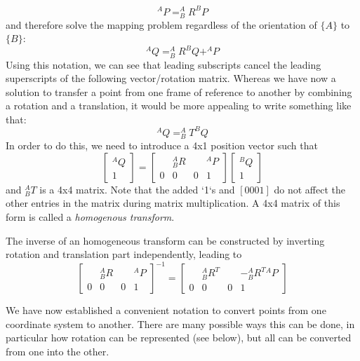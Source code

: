 \begin{equation}
^AP=^A_BR^BP
\end{equation}
%
and therefore solve the mapping problem regardless of the orientation of $\{A\}$ to $\{B\}$:
\begin{equation}
^AQ=^A_BR^BQ+^AP
\end{equation}
Using this notation, we can see that leading subscripts cancel the leading superscripts of the following vector/rotation matrix. Whereas we have now a solution to transfer a point from one frame of reference to another by combining a rotation and a translation, it would be more appealing to write something like that:
\begin{equation}
^AQ=^A_BT^BQ
\end{equation}
In order to do this, we need to introduce a 4x1 position vector such that
\begin{equation}
\left[\begin{array}{c}^AQ\\1\end{array}\right]=\left[\begin{array}{ccc|c} & ^A_BR & & ^AP \\\hline 0 & 0 & 0 & 1\end{array}\right]\left[\begin{array}{c}^BQ\\1\end{array}\right]
\end{equation}
and $^A_BT$ is a 4x4 matrix.  Note that the added `1`s and $ [0 0 0 1]$ do not affect the other entries in the matrix during matrix multiplication. A 4x4 matrix of this form is called a \emph{homogenous transform}.

The inverse of an homogeneous transform can be constructed by inverting rotation and translation part independently, leading to
\begin{equation}
\left[\begin{array}{ccc|c} & ^A_BR & & ^AP \\\hline 0 & 0 & 0 & 1\end{array}\right]^{-1}=
\left[\begin{array}{ccc|c} & ^A_BR^T & & -^A_B{R^T}{^AP} \\\hline 0 & 0 & 0 & 1\end{array}\right]
\end{equation}

We have now established a convenient notation to convert points from one coordinate system to another. There are many possible ways this can be done, in particular how rotation can be represented (see below), but all can be converted from one into the other.

